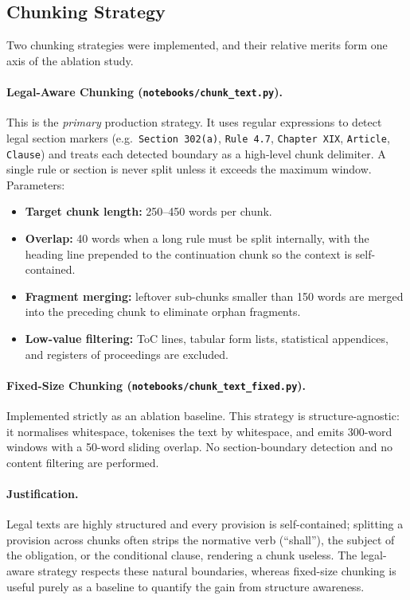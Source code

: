 \documentclass[11pt,a4paper]{article}
\begin{document}
\subsection{Chunking Strategy}

Two chunking strategies were implemented, and their relative merits form one axis of the ablation study.

\paragraph{Legal-Aware Chunking (\texttt{notebooks/chunk\_text.py}).}
This is the \emph{primary} production strategy. It uses regular expressions to detect legal section markers (e.g.\ \texttt{Section 302(a)}, \texttt{Rule 4.7}, \texttt{Chapter XIX}, \texttt{Article}, \texttt{Clause}) and treats each detected boundary as a high-level chunk delimiter. A single rule or section is never split unless it exceeds the maximum window. Parameters:
\begin{itemize}[leftmargin=*]
    \item \textbf{Target chunk length:} 250--450 words per chunk.
    \item \textbf{Overlap:} 40 words when a long rule must be split internally, with the heading line prepended to the continuation chunk so the context is self-contained.
    \item \textbf{Fragment merging:} leftover sub-chunks smaller than 150 words are merged into the preceding chunk to eliminate orphan fragments.
    \item \textbf{Low-value filtering:} ToC lines, tabular form lists, statistical appendices, and registers of proceedings are excluded.
\end{itemize}

\paragraph{Fixed-Size Chunking (\texttt{notebooks/chunk\_text\_fixed.py}).}
Implemented strictly as an ablation baseline. This strategy is structure-agnostic: it normalises whitespace, tokenises the text by whitespace, and emits 300-word windows with a 50-word sliding overlap. No section-boundary detection and no content filtering are performed.

\paragraph{Justification.}
Legal texts are highly structured and every provision is self-contained; splitting a provision across chunks often strips the normative verb (``shall''), the subject of the obligation, or the conditional clause, rendering a chunk useless. The legal-aware strategy respects these natural boundaries, whereas fixed-size chunking is useful purely as a baseline to quantify the gain from structure awareness.
\end{document}
